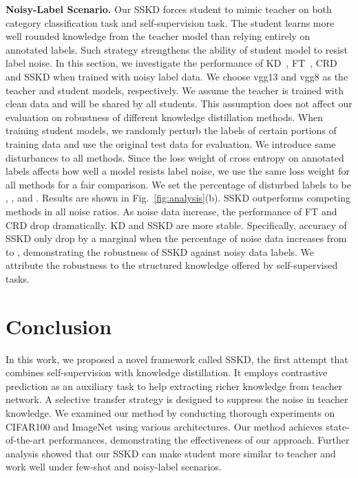 \documentclass[runningheads]{llncs}
\begin{document}
\noindent
\textbf{Noisy-Label Scenario.}
Our SSKD forces student to mimic teacher on both category classification task and self-supervision task. The student learns more well rounded knowledge from the teacher model than relying entirely on annotated labels. Such strategy strengthens the ability of student model to resist label noise. In this section, we investigate the performance of KD~\cite{KD}, FT~\cite{FT}, CRD~\cite{crd} and SSKD when trained with noisy label data.
We choose vgg13 and vgg8 as the teacher and student models, respectively. We assume the teacher is trained with clean data and will be shared by all students. This assumption does not affect our evaluation on robustness of different knowledge distillation methods. When training student models, we randomly perturb the labels of certain portions of training data and use the original test data for evaluation. We introduce same disturbances to all methods. Since the loss weight of cross entropy on annotated labels affects how well a model resists label noise, we use the same loss weight for all methods for a fair comparison.
We set the percentage of disturbed labels to be , ,  and . Results are shown in Fig.~\ref{fig:analysis}(b). SSKD outperforms competing methods in all noise ratios. As noise data increase, the performance of FT and CRD drop dramatically. KD and SSKD are more stable.
Specifically, accuracy of SSKD only drop by a marginal  when the percentage of noise data increases from  to , demonstrating the robustness of SSKD against noisy data labels. We attribute the robustness to the structured knowledge offered by self-supervised tasks.

 
\section{Conclusion}

In this work, we proposed a novel framework called SSKD, the first attempt that combines self-supervision with knowledge distillation. It employs contrastive prediction as an auxiliary task to help extracting richer knowledge from teacher network. A selective transfer strategy is designed to suppress the noise in teacher knowledge. We examined our method by conducting thorough experiments on CIFAR100 and ImageNet using various architectures. Our method achieves state-of-the-art performances, demonstrating the effectiveness of our approach. Further analysis showed that our SSKD can make student more similar to teacher and work well under few-shot and noisy-label scenarios.
\end{document}
